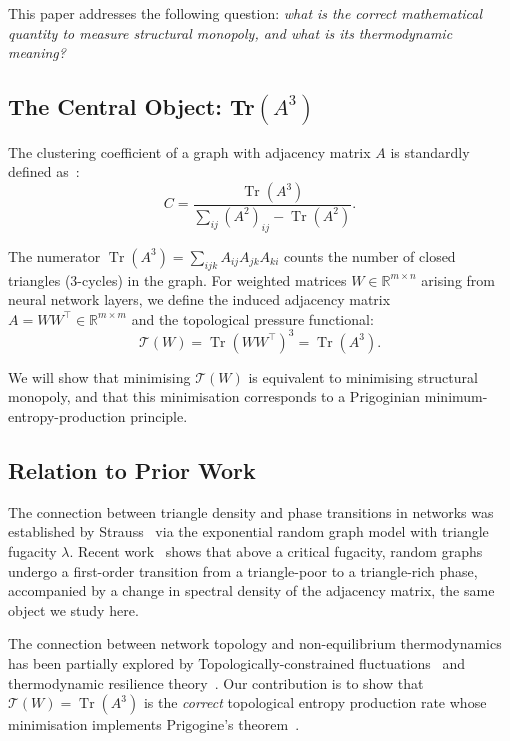 \documentclass[11pt,a4paper]{article}
\begin{document}
This paper addresses the following question: \emph{what is the correct
mathematical quantity to measure structural monopoly, and what is its
thermodynamic meaning?}

\subsection{The Central Object: Tr$(A^3)$}

The clustering coefficient of a graph with adjacency matrix $A$ is
standardly defined as~\cite{watts1998}:
\begin{equation}
C = \frac{\operatorname{Tr}(A^3)}{\sum_{ij}(A^2)_{ij} - \operatorname{Tr}(A^2)}.
\label{eq:clustering}
\end{equation}

The numerator $\operatorname{Tr}(A^3) = \sum_{ijk} A_{ij}A_{jk}A_{ki}$
counts the number of closed triangles (3-cycles) in the graph. For
weighted matrices $W \in \mathbb{R}^{m \times n}$ arising from neural
network layers, we define the induced adjacency matrix
$A = WW^\top \in \mathbb{R}^{m \times m}$ and the topological pressure
functional:
\begin{equation}
\mathcal{T}(W) = \operatorname{Tr}(WW^\top)^3 = \operatorname{Tr}(A^3).
\label{eq:T_functional}
\end{equation}

We will show that minimising $\mathcal{T}(W)$ is equivalent to
minimising structural monopoly, and that this minimisation corresponds
to a Prigoginian minimum-entropy-production principle.

\subsection{Relation to Prior Work}

The connection between triangle density and phase transitions in
networks was established by Strauss~\cite{strauss1986} via the
exponential random graph model with triangle fugacity $\lambda$.
Recent work~\cite{motif2026} shows that above a critical fugacity,
random graphs undergo a first-order transition from a triangle-poor
to a triangle-rich phase, accompanied by a change in spectral density
of the adjacency matrix, the same object we study here.

The connection between network topology and non-equilibrium
thermodynamics has been partially explored by Topologically-constrained
fluctuations~\cite{martins2023} and thermodynamic resilience
theory~\cite{toporesilience2017}. Our contribution is to show that
$\mathcal{T}(W) = \operatorname{Tr}(A^3)$ is the \emph{correct}
topological entropy production rate whose minimisation implements
Prigogine's theorem~\cite{prigogine1967}.
\end{document}
